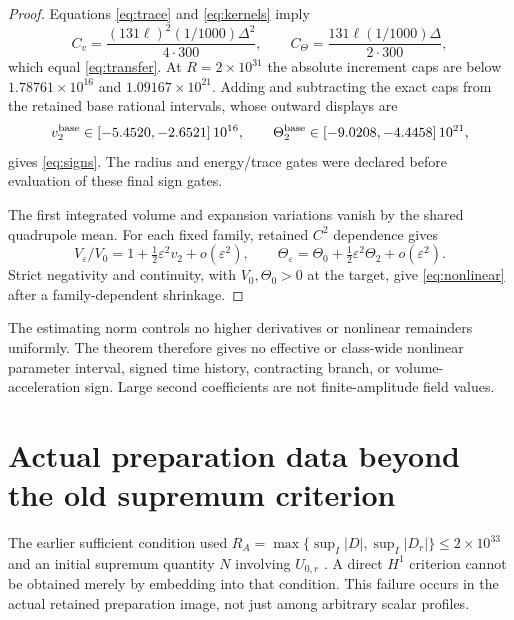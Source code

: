 \documentclass[11pt]{article}
\newcommand{\eps}{\varepsilon}
\begin{document}
\begin{proof}
Equations \eqref{eq:trace} and \eqref{eq:kernels} imply
\begin{equation}
 C_v=\frac{(131\ell)^2(1/1000)\Delta^2}{4\cdot300},\qquad
 C_\Theta=\frac{131\ell(1/1000)\Delta}{2\cdot300},
 \label{eq:Cformula}
\end{equation}
which equal \eqref{eq:transfer}. At $R=2\times10^{31}$ the absolute
increment caps are below $1.78761\times10^{16}$ and
$1.09167\times10^{21}$. Adding and subtracting the exact caps from the
retained base rational intervals, whose outward displays are
\begin{equation}
 v_2^{\rm base}\in[-5.4520,-2.6521]\,10^{16},\qquad
 \Theta_2^{\rm base}\in[-9.0208,-4.4458]\,10^{21},
 \label{eq:baseintervals}
\end{equation}
gives \eqref{eq:signs}. The radius and energy/trace gates were declared
before evaluation of these final sign gates.

The first integrated volume and expansion variations vanish by the shared
quadrupole mean. For each fixed family, retained $C^2$ dependence gives
\begin{equation}
 V_\eps/V_0=1+\tfrac12\eps^2v_2+o(\eps^2),\qquad
 \Theta_\eps=\Theta_0+\tfrac12\eps^2\Theta_2+o(\eps^2).
 \label{eq:Taylor}
\end{equation}
Strict negativity and continuity, with $V_0,\Theta_0>0$ at the target,
give \eqref{eq:nonlinear} after a family-dependent shrinkage.
\end{proof}

The estimating norm controls no higher derivatives or nonlinear remainders
uniformly. The theorem therefore gives no effective or class-wide nonlinear
parameter interval, signed time history, contracting branch, or
volume-acceleration sign. Large second coefficients are not finite-amplitude
field values.

\section{Actual preparation data beyond the old supremum criterion}

The earlier sufficient condition used
$R_A=\max\{\sup_I|D|,\sup_I|D_r|\}\le2\times10^{33}$
and an initial supremum quantity $N$ involving $U_{0,r}$
\cite{intrinsic}. A direct $H^1$ criterion cannot be obtained merely by
embedding into that condition. This failure occurs in the actual retained
preparation image, not just among arbitrary scalar profiles.
\end{document}
